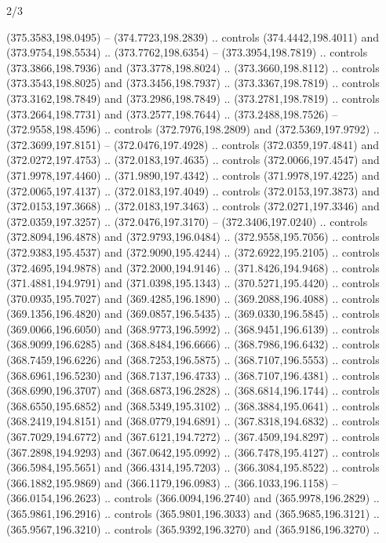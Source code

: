 \begin{flagdescription}{2/3}
\begin{scope}[xshift=0.5\flaglength,yshift=0.5\flagwidth,scale=\flagwidth/495.65]
\begin{scope}[y=0.8pt, x=0.8pt, yscale=-1,shift={(-463.76,-309.78)}]
  (375.3583,198.0495) -- (374.7723,198.2839) .. controls (374.4442,198.4011) and
  (373.9754,198.5534) .. (373.7762,198.6354) -- (373.3954,198.7819) .. controls
  (373.3866,198.7936) and (373.3778,198.8024) .. (373.3660,198.8112) .. controls
  (373.3543,198.8025) and (373.3456,198.7937) .. (373.3367,198.7819) .. controls
  (373.3162,198.7849) and (373.2986,198.7849) .. (373.2781,198.7819) .. controls
  (373.2664,198.7731) and (373.2577,198.7644) .. (373.2488,198.7526) --
  (372.9558,198.4596) .. controls (372.7976,198.2809) and (372.5369,197.9792) ..
  (372.3699,197.8151) -- (372.0476,197.4928) .. controls (372.0359,197.4841) and
  (372.0272,197.4753) .. (372.0183,197.4635) .. controls (372.0066,197.4547) and
  (371.9978,197.4460) .. (371.9890,197.4342) .. controls (371.9978,197.4225) and
  (372.0065,197.4137) .. (372.0183,197.4049) .. controls (372.0153,197.3873) and
  (372.0153,197.3668) .. (372.0183,197.3463) .. controls (372.0271,197.3346) and
  (372.0359,197.3257) .. (372.0476,197.3170) -- (372.3406,197.0240) .. controls
  (372.8094,196.4878) and (372.9793,196.0484) .. (372.9558,195.7056) .. controls
  (372.9383,195.4537) and (372.9090,195.4244) .. (372.6922,195.2105) .. controls
  (372.4695,194.9878) and (372.2000,194.9146) .. (371.8426,194.9468) .. controls
  (371.4881,194.9791) and (371.0398,195.1343) .. (370.5271,195.4420) .. controls
  (370.0935,195.7027) and (369.4285,196.1890) .. (369.2088,196.4088) .. controls
  (369.1356,196.4820) and (369.0857,196.5435) .. (369.0330,196.5845) .. controls
  (369.0066,196.6050) and (368.9773,196.5992) .. (368.9451,196.6139) .. controls
  (368.9099,196.6285) and (368.8484,196.6666) .. (368.7986,196.6432) .. controls
  (368.7459,196.6226) and (368.7253,196.5875) .. (368.7107,196.5553) .. controls
  (368.6961,196.5230) and (368.7137,196.4733) .. (368.7107,196.4381) .. controls
  (368.6990,196.3707) and (368.6873,196.2828) .. (368.6814,196.1744) .. controls
  (368.6550,195.6852) and (368.5349,195.3102) .. (368.3884,195.0641) .. controls
  (368.2419,194.8151) and (368.0779,194.6891) .. (367.8318,194.6832) .. controls
  (367.7029,194.6772) and (367.6121,194.7272) .. (367.4509,194.8297) .. controls
  (367.2898,194.9293) and (367.0642,195.0992) .. (366.7478,195.4127) .. controls
  (366.5984,195.5651) and (366.4314,195.7203) .. (366.3084,195.8522) .. controls
  (366.1882,195.9869) and (366.1179,196.0983) .. (366.1033,196.1158) --
  (366.0154,196.2623) .. controls (366.0094,196.2740) and (365.9978,196.2829) ..
  (365.9861,196.2916) .. controls (365.9801,196.3033) and (365.9685,196.3121) ..
  (365.9567,196.3210) .. controls (365.9392,196.3270) and (365.9186,196.3270) ..

\end{scope}
\end{scope}
\end{flagdescription}
